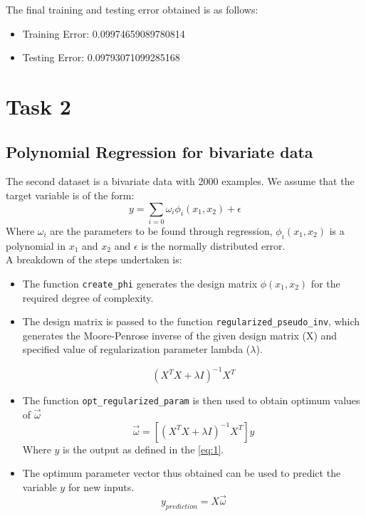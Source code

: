\documentclass[12pt,a4paper]{article}
\newcommand{\noi}{\noindent}
\def\tt#1{\texttt{#1}}
\begin{document}
\noi
The final training and testing error obtained is as follows:
\begin{itemize}
    \itemsep0em
    \item Training Error: 0.09974659089780814
    \item Testing Error: 0.09793071099285168
\end{itemize}

\section{Task 2}
\subsection{Polynomial Regression for bivariate data}
The second dataset is a bivariate data with 2000 examples. We assume that the target variable is of the form:
\begin{equation}
\label{eq:1}
    y=\sum_{i=0}\omega _{i}\phi_{i}(x_1,x_2)  +\epsilon 
\end{equation}
Where $\omega_{i}$ are the parameters to be found through regression, $\phi_{i}(x_1,x_2)$ is a polynomial in $x_1$ and $x_2$ and $\epsilon$ is the normally distributed error.\\ 

\noi
A breakdown of the steps undertaken is:
\begin{itemize}
    \itemsep0em
    \item The function \tt{create\_phi} generates the design matrix $\phi(x_1,x_2)$ for the required degree of complexity.
    \item The design matrix is passed to the function \tt{regularized\_pseudo\_inv}, which generates the Moore-Penrose inverse of the given design matrix (X) and specified value of regularization parameter lambda ($\lambda$).
    
    \begin{equation}
         (X^T X + \lambda I)^{-1}X^T
    \end{equation}
    
    \item The function \tt{opt\_regularized\_param} is then used to obtain optimum values of $\vec{\omega}$
    \begin{equation}
        \vec{\omega} = [(X^T X + \lambda I)^{-1}X^T]y
    \end{equation}
    Where $y$ is the output as defined in the \autoref{eq:1}.
    
    \item The optimum parameter vector thus obtained can be used to predict the variable $y$ for new inputs. 
    \begin{equation}
        y_{prediction}=X\vec{\omega}
    \end{equation}
\end{itemize}
\end{document}
